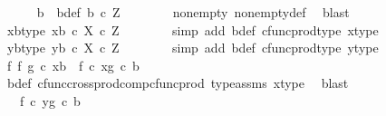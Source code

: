 \begin{isabellebody}
\ \ \ \ \isamarkupfalse%
\ b\ \ b{\isacharunderscore}{\kern0pt}def{\isacharcolon}{\kern0pt}\ {\isachardoublequoteopen}b\ {\isasymin}\isactrlsub c\ Z{\isachardoublequoteclose}\isanewline
\ \ \ \ \ \ \isamarkupfalse%
\ nonempty{\isacharparenleft}{\kern0pt}{}{\isacharparenright}{\kern0pt}\ nonempty{\isacharunderscore}{\kern0pt}def\ \isamarkupfalse%
\ blast\isanewline
\isanewline
\ \ \ \ \isamarkupfalse%
\ xb{\isacharunderscore}{\kern0pt}type{\isacharcolon}{\kern0pt}\ {\isachardoublequoteopen}{\isasymlangle}x{\isacharcomma}{\kern0pt}b{\isasymrangle}\ {\isasymin}\isactrlsub c\ X\ {\isasymtimes}\isactrlsub c\ Z{\isachardoublequoteclose}\isanewline
\ \ \ \ \ \ \isamarkupfalse%
\ {\isacharparenleft}{\kern0pt}simp\ add{\isacharcolon}{\kern0pt}\ b{\isacharunderscore}{\kern0pt}def\ cfunc{\isacharunderscore}{\kern0pt}prod{\isacharunderscore}{\kern0pt}type\ x{\isacharunderscore}{\kern0pt}type{}{\isacharparenright}{\kern0pt}\isanewline
\ \ \ \ \isamarkupfalse%
\ yb{\isacharunderscore}{\kern0pt}type{\isacharcolon}{\kern0pt}\ {\isachardoublequoteopen}{\isasymlangle}y{\isacharcomma}{\kern0pt}b{\isasymrangle}\ {\isasymin}\isactrlsub c\ X\ {\isasymtimes}\isactrlsub c\ Z{\isachardoublequoteclose}\isanewline
\ \ \ \ \ \ \isamarkupfalse%
\ {\isacharparenleft}{\kern0pt}simp\ add{\isacharcolon}{\kern0pt}\ b{\isacharunderscore}{\kern0pt}def\ cfunc{\isacharunderscore}{\kern0pt}prod{\isacharunderscore}{\kern0pt}type\ y{\isacharunderscore}{\kern0pt}type{}{\isacharparenright}{\kern0pt}\isanewline
\ \ \ \ \isamarkupfalse%
\ {\isachardoublequoteopen}{\isacharparenleft}{\kern0pt}f\ {\isasymtimes}\isactrlsub f\ g{\isacharparenright}{\kern0pt}\ {\isasymcirc}\isactrlsub c\ {\isasymlangle}x{\isacharcomma}{\kern0pt}b{\isasymrangle}\ {\isacharequal}{\kern0pt}\ {\isasymlangle}f\ {\isasymcirc}\isactrlsub c\ x{\isacharcomma}{\kern0pt}g\ {\isasymcirc}\isactrlsub c\ b{\isasymrangle}{\isachardoublequoteclose}\isanewline
\ \ \ \ \ \ \isamarkupfalse%
\ b{\isacharunderscore}{\kern0pt}def\ cfunc{\isacharunderscore}{\kern0pt}cross{\isacharunderscore}{\kern0pt}prod{\isacharunderscore}{\kern0pt}comp{\isacharunderscore}{\kern0pt}cfunc{\isacharunderscore}{\kern0pt}prod\ type{\isacharunderscore}{\kern0pt}assms\ x{\isacharunderscore}{\kern0pt}type{}\ \isamarkupfalse%
\ blast\isanewline
\ \ \ \ \isamarkupfalse%
\ \isamarkupfalse%
\ {\isachardoublequoteopen}{\isachardot}{\kern0pt}{\isachardot}{\kern0pt}{\isachardot}{\kern0pt}\ {\isacharequal}{\kern0pt}\ {\isasymlangle}f\ {\isasymcirc}\isactrlsub c\ y{\isacharcomma}{\kern0pt}g\ {\isasymcirc}\isactrlsub c\ b{\isasymrangle}{\isachardoublequoteclose}\isanewline

\end{isabellebody}
